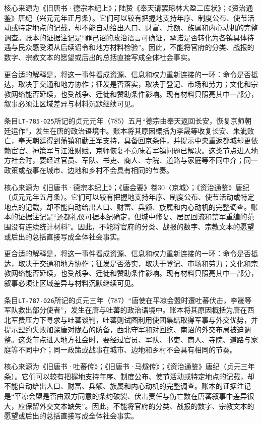 核心来源为《旧唐书·德宗本纪上》；陆贽《奉天请罢琼林大盈二库状》；《资治通鉴》唐纪（兴元元年正月条）。它们可以较有把握地支持年序、制度公布、使节活动或特定地点的记载，却不能自动给出人口、财富、兵额、族属和内心动机的完整调查。账本的证据注记是“罪己诏的政治语言可确证，承诺是否转化为各镇具体待遇与民众感受须从后续诏令和地方材料检验”。因此，不能将官府的分类、战报的数字、宗教文本的愿望或后出的总括直接写成全体社会事实。

更合适的解释是，将这一事件看成资源、信息和权力重新连接的一环：命令是否抵达，取决于交通和地方协作；征发是否落实，取决于登记、市场和劳力；文化和宗教网络能否延续，也受战争、迁徙和赞助条件影响。现有材料只照亮其中一部分，叙事必须让区域差异与材料沉默继续可见。

条目\texttt{LT-785-025}所记的贞元元年（785）五月“德宗由奉天返回长安，恢复京师朝廷运作”，发生在唐的政治语境中。账本将其原因概括为李晟等收复长安、朱泚败亡，奉天朝廷得到藩镇和勤王军支持，具备回京条件，并提示中央重返都城却更依赖宦官、神策军与江淮财赋，京师恢复不意味着军镇问题已解决。这类节点进入地方社会时，要经过官员、军队、书吏、商人、寺院、道路与家庭等不同中介；同一政策或战事在城市、边地和乡村不会具有相同的节奏。

核心来源为《旧唐书·德宗本纪上》；《唐会要》卷30〈京城〉；《资治通鉴》唐纪（贞元元年五月条）。它们可以较有把握地支持年序、制度公布、使节活动或特定地点的记载，却不能自动给出人口、财富、兵额、族属和内心动机的完整调查。账本的证据注记是“还都礼仪可据本纪确定，但城中修复、居民回流和禁军重编的范围没有连续统计材料”。因此，不能将官府的分类、战报的数字、宗教文本的愿望或后出的总括直接写成全体社会事实。

更合适的解释是，将这一事件看成资源、信息和权力重新连接的一环：命令是否抵达，取决于交通和地方协作；征发是否落实，取决于登记、市场和劳力；文化和宗教网络能否延续，也受战争、迁徙和赞助条件影响。现有材料只照亮其中一部分，叙事必须让区域差异与材料沉默继续可见。

条目\texttt{LT-787-026}所记的贞元三年（787）“唐使在平凉会盟时遭吐蕃伏击，李晟等军队救出部分使者”，发生在唐与吐蕃的政治语境中。账本将其原因概括为唐在西北军费压力下寻求与吐蕃谈判，吐蕃则试图利用使团集结取得军事与外交优势，并提示盟约失败加深唐对陇右的防备，西北守军和对回纥、南诏的外交布局被迫调整。这类节点进入地方社会时，要经过官员、军队、书吏、商人、寺院、道路与家庭等不同中介；同一政策或战事在城市、边地和乡村不会具有相同的节奏。

核心来源为《旧唐书·吐蕃传》；《旧唐书·马燧传》；《资治通鉴》唐纪（贞元三年条）。它们可以较有把握地支持年序、制度公布、使节活动或特定地点的记载，却不能自动给出人口、财富、兵额、族属和内心动机的完整调查。账本的证据注记是“平凉会盟是否由双方同意的条约破裂、伏击责任与伤亡数在唐蕃叙事中差异很大，应保留外交文本缺失”。因此，不能将官府的分类、战报的数字、宗教文本的愿望或后出的总括直接写成全体社会事实。

